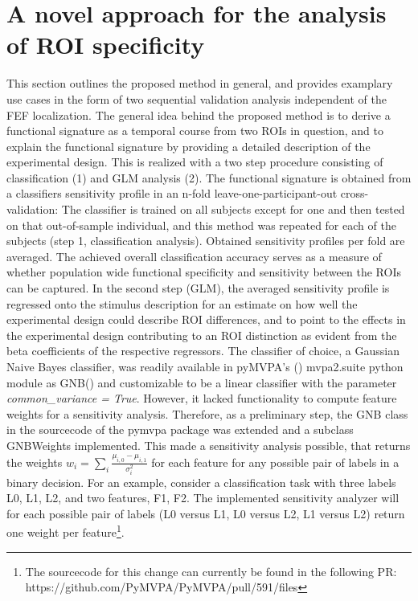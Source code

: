 \documentclass[a4paper, 12pt]{scrreprt}
\begin{document}
\section{A novel approach for the analysis of ROI specificity}\label{newmethod}
This section outlines the proposed method in general, and provides examplary use cases in the form of two sequential validation analysis independent of the FEF localization. \newline
The general idea behind the proposed method is to derive a functional signature as a temporal course from two ROIs in question, and to explain the functional signature by providing a detailed description of the experimental design. This is realized with a two step procedure consisting of classification (1) and GLM analysis (2).\newline
The functional signature is obtained from a classifiers sensitivity profile in an n-fold leave-one-participant-out cross-validation: The classifier is trained on all subjects except for one and then tested on that out-of-sample individual, and this method was repeated for each of the subjects (step 1, classification analysis). Obtained sensitivity profiles per fold are averaged. The achieved overall classification accuracy serves as a measure of whether population wide functional specificity and sensitivity between the ROIs can be captured. In the second step (GLM), the averaged sensitivity profile is regressed onto the stimulus description for an estimate on how well the experimental design could describe ROI differences, and to point to the effects in the experimental design contributing to an ROI distinction as evident from the beta coefficients of the respective regressors. \newline
The classifier of choice, a Gaussian Naive Bayes classifier, was readily available in pyMVPA’s (\cite{hanke2009pymvpa}) mvpa2.suite python module as GNB() and customizable to be a linear classifier with the parameter \textit{common\_variance = True}. However, it lacked functionality to compute feature weights for a sensitivity analysis. Therefore, as a preliminary step, the GNB class in the sourcecode of the pymvpa package was extended and a subclass GNBWeights implemented. This made a sensitivity analysis possible, that returns the weights $w_i = \sum_{i}\frac{\mu_{i, 0}-\mu_{i, 1}}{\sigma_{i}^{2}}$ for each feature for any possible pair of labels in a binary decision. For an example, consider a classification task with three labels L0, L1, L2, and two features, F1, F2. The implemented sensitivity analyzer will for each possible pair of labels (L0 versus L1, L0 versus L2, L1 versus L2) return one weight per feature\footnote{The sourcecode for this change can currently be found in the following PR: https://github.com/PyMVPA/PyMVPA/pull/591/files}. \newline
\end{document}
